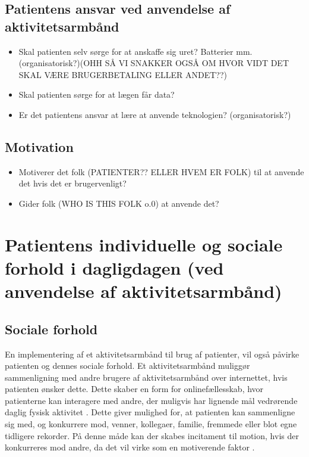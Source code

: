 \subsection{Patientens ansvar ved anvendelse af aktivitetsarmbånd}
\begin{itemize}
\item Skal patienten selv sørge for at anskaffe sig uret? Batterier mm. (organisatorisk?)(OHH SÅ VI SNAKKER OGSÅ OM HVOR VIDT DET SKAL VÆRE BRUGERBETALING ELLER ANDET??)
\item Skal patienten sørge for at lægen får data?
\item Er det patientens ansvar at lære at anvende teknologien? (organisatorisk?)
\end{itemize}

\subsection{Motivation}
\begin{itemize}
\item Motiverer det folk (PATIENTER?? ELLER HVEM ER FOLK) til at anvende det hvis det er brugervenligt?
\item Gider folk (WHO IS THIS FOLK o.0) at anvende det?
\end{itemize}

\section{Patientens individuelle og sociale forhold i dagligdagen (ved anvendelse af aktivitetsarmbånd)}
\subsection{Sociale forhold}
En implementering af et aktivitetsarmbånd til brug af patienter, vil også påvirke patienten og dennes sociale forhold. Et aktivitetsarmbånd muliggør sammenligning med andre brugere af aktivitetsarmbånd over internettet, hvis patienten ønsker dette. Dette skaber en form for onlinefællesskab, hvor patienterne kan interagere med andre, der muligvis har lignende mål vedrørende daglig fysisk aktivitet \citep{karapanos2016}. 
Dette giver mulighed for, at patienten kan sammenligne sig med, og konkurrere mod, venner, kollegaer, familie, fremmede eller blot egne tidligere rekorder. På denne måde kan der skabes incitament til motion, hvis der konkurreres mod andre, da det vil virke som en motiverende faktor \citep{rooksby2014}.

